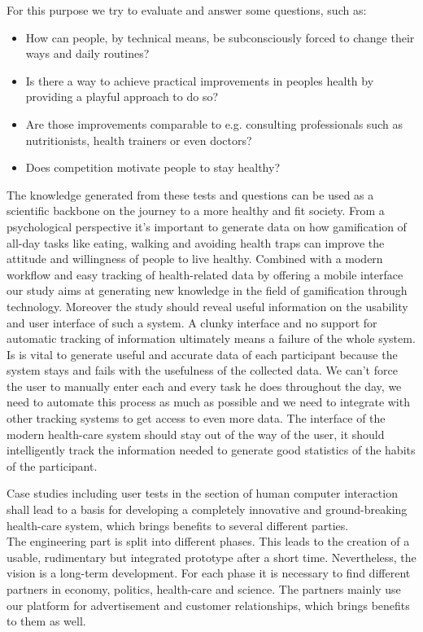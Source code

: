 \documentclass[a4paper,11pt]{article}
\begin{document}
For this purpose we try to evaluate and answer some questions, such as:

\begin{itemize}
\item How can people, by technical means, be subconsciously forced to change their ways and daily routines?
\item Is there a way to achieve practical improvements in peoples health by providing a playful approach to do so?
\item Are those improvements comparable to e.g. consulting professionals such as nutritionists, health trainers or even doctors?
\item Does competition motivate people to stay healthy?
\end{itemize}

The knowledge generated from these tests and questions can be used as a scientific backbone on the journey to a more healthy and fit society. From a psychological perspective it's important to generate data on how gamification of all-day tasks like eating, walking and avoiding health traps can improve the attitude and willingness of people to live healthy. Combined with a modern workflow and easy tracking of health-related data by offering a mobile interface our study aims at generating new knowledge in the field of gamification through technology. Moreover the study should reveal useful information on the usability and user interface of such a system. A clunky interface and no support for automatic tracking of information ultimately means a failure of the whole system. Is is vital to generate useful and accurate data of each participant because the system stays and fails with the usefulness of the collected data. We can't force the user to manually enter each and every task he does throughout the day, we need to automate this process as much as possible and we need to integrate with other tracking systems to get access to even more data. The interface of the modern health-care system should stay out of the way of the user, it should intelligently track the information needed to generate good statistics of the habits of the participant.

Case studies including user tests in the section of human computer interaction shall lead to a basis for developing a completely innovative and ground-breaking health-care system, which brings benefits to several different parties.\\

The engineering part is split into different phases. This leads to the creation of a usable, rudimentary but integrated prototype after a short time. Nevertheless, the vision is a long-term development. For each phase it is necessary to find different partners in economy, politics, health-care and science. The partners mainly use our platform for advertisement and customer relationships, which brings benefits to them as well.
\end{document}
